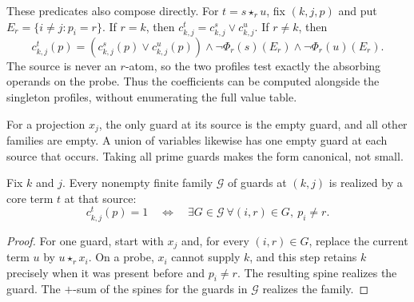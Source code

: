 These predicates also compose directly. For $t=s\star_r u$, fix $(k,j,p)$
and put $E_r=\{i\ne j:p_i=r\}$. If $r=k$, then
$c^t_{k,j}=c^s_{k,j}\lor c^u_{k,j}$. If $r\ne k$, then
\[
 c^t_{k,j}(p)=
 (c^s_{k,j}(p)\lor c^u_{k,j}(p))\land
 \neg\Phi_r(s)(E_r)\land\neg\Phi_r(u)(E_r).
\]
The source is never an $r$-atom, so the two profiles test exactly the
absorbing operands on the probe. Thus the coefficients can be computed
alongside the singleton profiles, without enumerating the full value table.

For a projection $x_j$, the only guard at its source is the empty guard,
and all other families are empty. A union of variables likewise has one
empty guard at each source that occurs. Taking all prime guards makes the
form canonical, not small.

\begin{proposition}\label{core:prop:guard-synthesis}
Fix $k$ and $j$. Every nonempty finite family $\mathcal G$ of guards at
$(k,j)$ is realized by a core term $t$ at that source:
\[
 c^t_{k,j}(p)=1\quad\Longleftrightarrow\quad
 \exists G\in\mathcal G\ \forall(i,r)\in G,\ p_i\ne r.
\]
\end{proposition}
\begin{proof}
For one guard, start with $x_j$ and, for every $(i,r)\in G$, replace
the current term $u$ by $u\star_r x_i$. On a probe, $x_i$ cannot
supply $k$, and this step retains $k$ precisely when it was present
before and $p_i\ne r$. The resulting spine realizes the guard.
The $+$-sum of the spines for the guards in $\mathcal G$ realizes the family.
\end{proof}





















